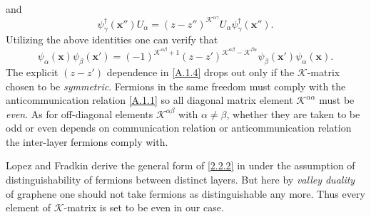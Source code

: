 \documentclass[bachelor,english,numbers]{ustcthesis}
\begin{document}
	and
	\begin{equation}\label{A.1.3}
		\psi^\dagger_\gamma(\bm{x''})U_\alpha=(z-z'')^{\mathcal{K}^{\alpha \gamma}}U_\alpha\psi^\dagger_\gamma(\bm{x''}).
	\end{equation}
	Utilizing the above identities one can verify that
	\begin{equation}\label{A.1.4}
		\psi_\alpha(\bm{x})\psi_\beta(\bm{x'})=(-1)^{\mathcal{K}^{\alpha \beta}+1}(z-z')^{\mathcal{K}^{\alpha \beta}-\mathcal{K}^{\beta \alpha}}\psi_\beta(\bm{x'})\psi_\alpha(\bm{x}).
	\end{equation}
	The explicit $(z-z')$ dependence in \eqref{A.1.4} drops out only if the $\mathcal{K}$-matrix chosen to be \emph{symmetric}. Fermions in the same freedom must comply with the anticommunication relation \eqref{A.1.1} so all diagonal matrix element $\mathcal{K}^{\alpha \alpha}$ must be \emph{even}. As for off-diagonal elements $\mathcal{K}^{\alpha \beta}$ with $\alpha\neq \beta$, whether they are taken to be odd or even depends on communication relation or anticommunication relation the inter-layer fermions comply with.\par 

	Lopez and Fradkin derive the general form of \eqref{2.2.2} in \cite{lopez1995fermionic} under the assumption of distinguishability of fermions between distinct layers. But here by \emph{valley duality} of graphene one should not take fermions as distinguishable any more. Thus every element of $\mathcal{K}$-matrix is set to be even in our case.
\end{document}
